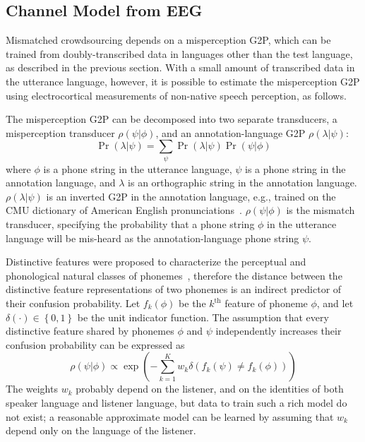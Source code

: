 \subsection{Channel Model from EEG}

Mismatched crowdsourcing depends on a misperception G2P, which can be
trained from doubly-transcribed data in languages other than the test
language, as described in the previous section.  With a small amount
of transcribed data in the utterance language, however, it is possible
to estimate the misperception G2P using electrocortical measurements
of non-native speech perception, as follows.

The misperception G2P can be decomposed into two separate transducers,
a misperception transducer $\rho(\psi|\phi)$, and an
annotation-language G2P $\rho(\lambda|\psi)$:
\begin{equation}
  \Pr(\lambda|\psi)=\sum_{\psi}\Pr(\lambda|\psi)\Pr(\psi|\phi)
\end{equation}
where $\phi$ is a phone string in the utterance language, $\psi$ is a
phone string in the annotation language, and $\lambda$ is an
orthographic string in the annotation language.  $\rho(\lambda|\psi)$
is an inverted G2P in the annotation language, e.g., trained on the
CMU dictionary of American English pronunciations~\cite{Lenzo1995}.
$\rho(\psi|\phi)$ is the mismatch transducer, specifying the
probability that a phone string $\phi$ in the utterance language will
be mis-heard as the annotation-language phone string $\psi$.

Distinctive features were proposed to characterize the perceptual and
phonological natural classes of phonemes~\cite{Jakobson52}, therefore
the distance between the distinctive feature representations of two
phonemes is an indirect predictor of their confusion probability.  Let
$f_k(\phi)$ be the $k^{\textrm{th}}$ feature of phoneme $\phi$, and
let $\delta(\cdot)\in\left\{0,1\right\}$ be the unit indicator
function.  The assumption that every distinctive feature shared by
phonemes $\phi$ and $\psi$ independently increases their confusion
probability can be expressed as
\begin{equation}
  \rho(\psi|\phi)\propto \exp\left(-\sum_{k=1}^K
  w_k\delta\left(f_k(\psi)\ne f_k(\phi)\right)\right)
  \label{eq:dfdist}
\end{equation}
The weights $w_k$ probably depend on the listener, and on the
identities of both speaker language and listener language, but data to
train such a rich model do not exist; a reasonable approximate model
can be learned by assuming that $w_k$ depend only on the language of
the listener.

